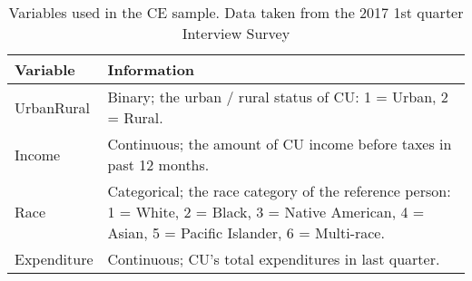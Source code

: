 \documentclass[11pt]{article}
\begin{document}
\begin{table}
\centering
\begin{tabular}{p{0.7in} p{5.5in}}
Variable &  Information \\ \hline
UrbanRural & Binary; the urban / rural status of CU: 1 = Urban, 2 = Rural. \\
Income & Continuous; the amount of CU income before taxes in past 12 months. \\
Race & Categorical; the race category of the reference person: 1 = White, 2 = Black, 3 = Native American,
4 = Asian, 5 = Pacific Islander, 6 = Multi-race. \\ 
Expenditure & Continuous; CU's total expenditures in last quarter. \\ \hline
\end{tabular}
\caption{Variables used in the CE sample. Data taken
  from the 2017 1st quarter Interview Survey} 
\end{table}
\end{document}
